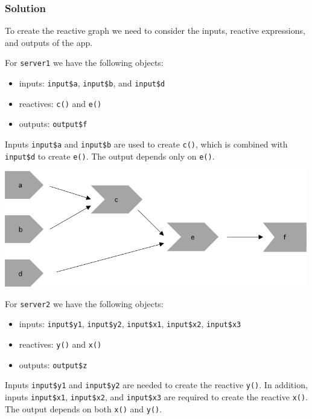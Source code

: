 \documentclass[]{book}
\providecommand{\tightlist}{%
  \setlength{\itemsep}{0pt}\setlength{\parskip}{0pt}}
\begin{document}
\begin{solution}

\hypertarget{solution}{%
\subsubsection*{Solution}\label{solution}}

To create the reactive graph we need to consider the inputs, reactive
expressions, and outputs of the app.

For \texttt{server1} we have the following objects:

\begin{itemize}
\tightlist
\item
  inputs: \texttt{input\$a}, \texttt{input\$b}, and \texttt{input\$d}
\item
  reactives: \texttt{c()} and \texttt{e()}
\item
  outputs: \texttt{output\$f}
\end{itemize}

Inputs \texttt{input\$a} and \texttt{input\$b} are used to create \texttt{c()}, which is combined with
\texttt{input\$d} to create \texttt{e()}. The output depends only on \texttt{e()}.

\includegraphics[width=5.20833in,height=\textheight]{images/4.3.6.1-s1.png}

For \texttt{server2} we have the following objects:

\begin{itemize}
\tightlist
\item
  inputs: \texttt{input\$y1}, \texttt{input\$y2}, \texttt{input\$x1}, \texttt{input\$x2}, \texttt{input\$x3}
\item
  reactives: \texttt{y()} and \texttt{x()}
\item
  outputs: \texttt{output\$z}
\end{itemize}

Inputs \texttt{input\$y1} and \texttt{input\$y2} are needed to create the reactive \texttt{y()}. In
addition, inputs \texttt{input\$x1}, \texttt{input\$x2}, and \texttt{input\$x3} are required to create
the reactive \texttt{x()}. The output depends on both \texttt{x()} and \texttt{y()}.


\end{solution}
\end{document}
